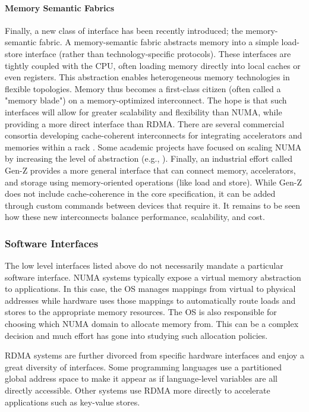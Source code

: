 \paragraph{Memory Semantic Fabrics}
Finally, a new class of interface has been recently introduced; the
memory-semantic fabric. A memory-semantic fabric abstracts memory into a simple
load-store interface (rather than technology-specific protocols). These interfaces are tightly coupled with the CPU, often loading memory directly into local caches or even registers. This
abstraction enables heterogeneous memory technologies in flexible topologies.
Memory thus becomes a first-class citizen (often called a "memory blade") on a
memory-optimized interconnect. The hope is that such interfaces will allow for
greater scalability and flexibility than NUMA, while providing a more direct
interface than RDMA. There are several commercial consortia developing
cache-coherent interconnects for integrating accelerators and memories within a
rack \cite{ccix}\cite{capi}. Some academic projects have focused on scaling
NUMA by increasing the level of abstraction (e.g.,
\cite{sonuma}\cite{lim_disag}).  Finally, an industrial effort called Gen-Z
provides a more general interface that can connect memory, accelerators, and
storage using memory-oriented operations (like load and store)\cite{genz}.
While Gen-Z does not include cache-coherence in the core specification, it can
be added through custom commands between devices that require it. It remains to
be seen how these new interconnects balance performance, scalability, and cost.

\subsubsection{Software Interfaces} The low level interfaces listed above do
not necessarily mandate a particular software interface. NUMA systems typically
expose a virtual memory abstraction to applications. In this case, the OS
manages mappings from virtual to physical addresses while hardware uses those
mappings to automatically route loads and stores to the appropriate memory
resources. The OS is also responsible for choosing which NUMA domain to
allocate memory from. This can be a complex decision and much effort has gone
into studying such allocation policies\cite{linux_numa}.

RDMA systems are further divorced from specific hardware interfaces and enjoy a
great diversity of interfaces. Some programming languages use a partitioned
global address space to make it appear as if language-level variables are all
directly accessible\cite{upc}\cite{grappa}. Other systems use RDMA more
directly to accelerate applications such as key-value
stores\cite{ramcloud}\cite{farm}.

